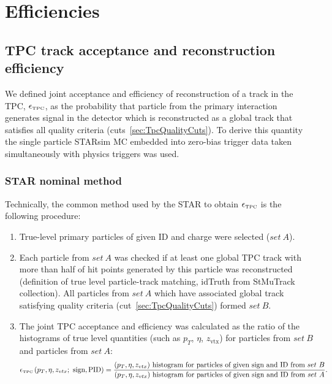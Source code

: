

\chapter{Efficiencies}\label{chap:efficiencies}

\section{TPC track acceptance and reconstruction efficiency}\label{sec:tpcAccAndEff}
We defined joint acceptance and efficiency of reconstruction of a track in the TPC, $\epsilon_{\textrm{\tiny TPC}}$, as the probability that particle from the primary interaction generates signal in the detector which is reconstructed as a global track that satisfies all quality criteria (cuts~\ref{sec:TpcQualityCuts}).
To derive this quantity the single particle STARsim MC embedded into zero-bias trigger data taken simultaneously with physics triggers 
 was used.
\subsection{STAR nominal method}
Technically, the common method used by the STAR to obtain  $\epsilon_{\textrm{\tiny TPC}}$ is the following procedure:
\begin{enumerate}
	\item True-level primary particles of given ID and charge were selected ($set~A$).
	\item Each particle from $set~A$ was checked if at least one global TPC track with more than half of hit points generated by this particle was reconstructed (definition of true level particle-track matching, idTruth from StMuTrack collection). All particles from $set~A$ which have associated global track satisfying quality criteria (cut~\ref{sec:TpcQualityCuts}) formed $set~B$.
	\item The joint TPC acceptance and efficiency was calculated as the ratio of the histograms of true level quantities (such as $p_{T}$, $\eta$, $z_{\textrm{vtx}}$) for particles from $set~B$ and particles from $set~A$:
	\begin{equation}\label{eq:tpcAccAndEffDefinition}
	\epsilon_{\textrm{\tiny TPC}}\left(p_{T}, \eta, z_{vtx};~\textrm{sign},\textrm{PID}\right) = \frac{(p_{T},\eta, z_{vtx})~\textrm{histogram for particles of given sign and ID from}~set~B}{(p_{T},\eta, z_{vtx})~\textrm{histogram for particles of given sign and ID from}~set~A}.
	\end{equation}
	
\end{enumerate}
